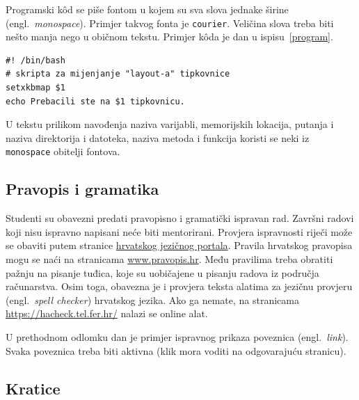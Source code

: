 Programski k\^od se piše fontom u kojem su sva slova jednake širine (engl.~\textit{monospace}). Primjer takvog fonta je \texttt{courier}. %
Veličina slova treba biti nešto manja nego u običnom tekstu. Primjer k\^oda je dan u ispisu~\ref{program}.
%

\begin{lstlisting}[caption={Skripta za mijenjanje rasporeda tipki tipkovnice}, label=program]
#! /bin/bash
# skripta za mijenjanje "layout-a" tipkovnice
setxkbmap $1
echo Prebacili ste na $1 tipkovnicu.
\end{lstlisting}

U tekstu prilikom navođenja naziva varijabli, memorijskih lokacija, putanja i naziva direktorija i datoteka, naziva metoda i funkcija koristi se neki iz \texttt{monospace} obitelji fontova.

\subsection{Pravopis i gramatika}

Studenti su obavezni predati pravopisno i gramatički ispravan rad. Završni radovi koji nisu ispravno napisani neće biti mentorirani. Provjera ispravnosti riječi može se obaviti putem stranice \href{http://hjp.znanje.hr/}{hrvatskog jezičnog portala}. Pravila hrvatskog pravopisa mogu se naći na stranicama \href{www.pravopis.hr}{www.pravopis.hr}. Među pravilima treba obratiti pažnju na pisanje tuđica, koje su uobičajene u pisanju radova iz područja računarstva. Osim toga, obavezna je i provjera teksta alatima za jezičnu provjeru (engl.~\textit{spell checker}) hrvatskog jezika. Ako ga nemate, na stranicama \url{https://hacheck.tel.fer.hr/} nalazi se online alat.

U prethodnom odlomku dan je primjer ispravnog prikaza poveznica (engl.~\textit{link}). Svaka poveznica treba biti aktivna (klik mora voditi na odgovarajuću stranicu).

\subsection{Kratice}

